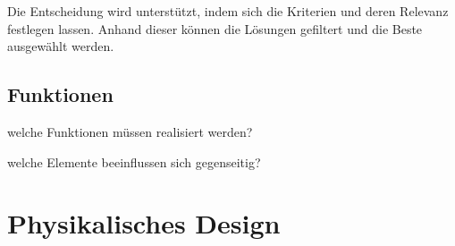 Die Entscheidung wird unterstützt, indem sich die Kriterien und deren Relevanz festlegen lassen. Anhand dieser können die Lösungen gefiltert und die Beste ausgewählt werden.

\subsection{Funktionen}


welche Funktionen müssen realisiert werden?

welche Elemente beeinflussen sich gegenseitig?

\section{Physikalisches Design}